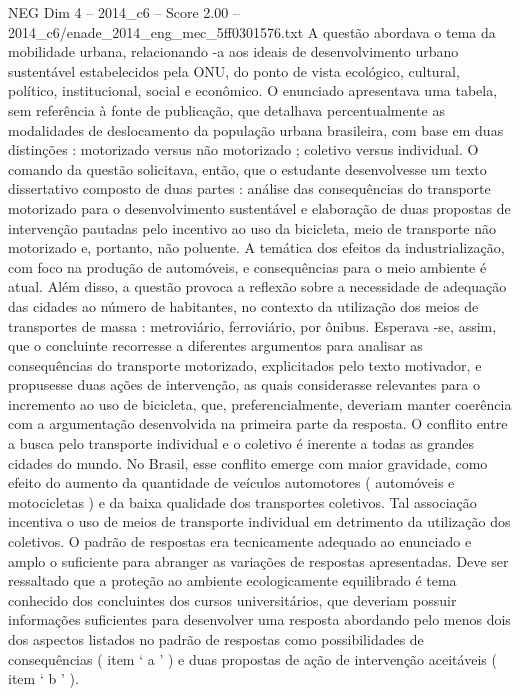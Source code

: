 \begin{textsample}{NEG Dim 4 – 2014\_c6 – Score 2.00 – 2014\_c6/enade\_2014\_eng\_mec\_5ff0301576.txt}
A questão abordava o tema da mobilidade urbana, relacionando -a aos ideais de desenvolvimento urbano sustentável estabelecidos pela ONU, do ponto de vista ecológico, cultural, político, institucional, social e econômico.
O enunciado apresentava uma tabela, sem referência à fonte de publicação, que detalhava percentualmente as modalidades de deslocamento da população urbana brasileira, com base em duas distinções : motorizado versus não motorizado ; coletivo versus individual.
O comando da questão solicitava, então, que o estudante desenvolvesse um texto dissertativo composto de duas partes : análise das consequências do transporte motorizado para o desenvolvimento sustentável e elaboração de duas propostas de intervenção pautadas pelo incentivo ao uso da bicicleta, meio de transporte não motorizado e, portanto, não poluente.
A temática dos efeitos da industrialização, com foco na produção de automóveis, e consequências para o meio ambiente é atual.
Além disso, a questão provoca a reflexão sobre a necessidade de adequação das cidades ao número de habitantes, no contexto da utilização dos meios de transportes de massa : metroviário, ferroviário, por ônibus.
Esperava -se, assim, que o concluinte recorresse a diferentes argumentos para analisar as consequências do transporte motorizado, explicitados pelo texto motivador, e propusesse duas ações de intervenção, as quais considerasse relevantes para o incremento ao uso de bicicleta, que, preferencialmente, deveriam manter coerência com a argumentação desenvolvida na primeira parte da resposta.
O conflito entre a busca pelo transporte individual e o coletivo é inerente a todas as grandes cidades do mundo.
No Brasil, esse conflito emerge com maior gravidade, como efeito do aumento da quantidade de veículos automotores ( automóveis e motocicletas ) e da baixa qualidade dos transportes coletivos.
Tal associação incentiva o uso de meios de transporte individual em detrimento da utilização dos coletivos.
O padrão de respostas era tecnicamente adequado ao enunciado e amplo o suficiente para abranger as variações de respostas apresentadas.
Deve ser ressaltado que a proteção ao ambiente ecologicamente equilibrado é tema conhecido dos concluintes dos cursos universitários, que deveriam possuir informações suficientes para desenvolver uma resposta abordando pelo menos dois dos aspectos listados no padrão de respostas como possibilidades de consequências ( item ‘ a ’ ) e duas propostas de ação de intervenção aceitáveis ( item ‘ b ’ ).

\end{textsample}
